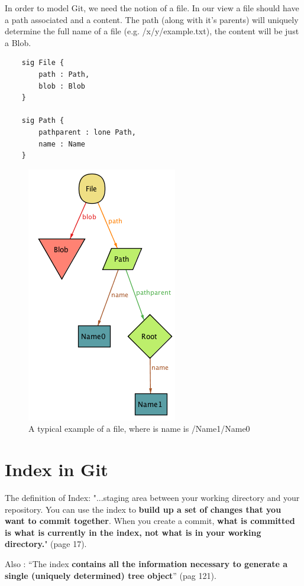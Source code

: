 In order to model Git, we need the notion of a file. In our view a file should have
a path associated and a content. The path (along with it's parents)
will uniquely determine the full name of a file
(e.g. /x/y/example.txt), the content will be just a Blob.

\begin{lstlisting}
	sig File {
		path : Path,
		blob : Blob
	}

	sig Path {
		pathparent : lone Path,
		name : Name
	}
\end{lstlisting}

\begin{figure}[h!] 
	\caption{A typical example of a file, where is name is /Name1/Name0 }
	\centering
	\includegraphics[scale=0.65]{images/image1.png}
\end{figure}
\pagebreak


\section{Index in Git}

The definition of Index:
"...staging area between your working directory and your
repository. You can use the index to {\bf build up a set of 
changes that you want to commit together}. When you create
a commit, {\bf what is committed is what is currently in the
index, not what is in your working directory.}"
\cite{gitComm} (page 17). \par

Also : ``The index {\bf contains all the information necessary to generate a single
(uniquely determined) tree object}'' \cite{gitComm} (pag 121). \par

